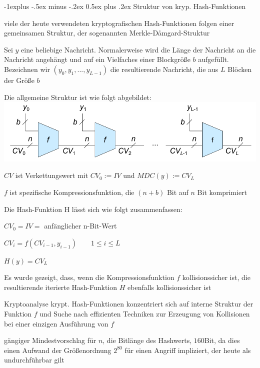 \documentclass[a4paper]{article}
\makeatletter
\renewcommand{\subsection}{\@startsection{subsection}{2}{0mm}%
 {-1explus -.5ex minus -.2ex}%
 {0.5ex plus .2ex}%
 {\normalfont\normalsize\bfseries}}
\makeatother
\begin{document}
\begin{multicols}{3}
      \subsection{Struktur von kryp. Hash-Funktionen}
      \begin{itemize*}
            \item viele der heute verwendeten kryptografischen Hash-Funktionen folgen einer gemeinsamen Struktur, der sogenannten Merkle-Dåmgard-Struktur
            \begin{itemize*}
                  \item Sei $y$ eine beliebige Nachricht. Normalerweise wird die Länge der Nachricht an die Nachricht angehängt und auf ein Vielfaches einer Blockgröße $b$ aufgefüllt. Bezeichnen wir $(y_0,y_1,...,y_{L-1})$ die resultierende Nachricht, die aus $L$ Blöcken der Größe $b$
                  \item Die allgemeine Struktur ist wie folgt abgebildet: \includegraphics[width=.5\linewidth]{Assets/NetworkSecurity-feistel.png}
                  \item $CV$ ist Verkettungswert mit $CV_0:=IV$ und $MDC(y):=CV_L$
                  \item $f$ ist spezifische Kompressionsfunktion, die $(n+b)$ Bit auf $n$ Bit komprimiert
            \end{itemize*}
            \item Die Hash-Funktion H lässt sich wie folgt zusammenfassen:
            \begin{itemize*}
                  \item $CV_0 = IV =$ anfänglicher n-Bit-Wert
                  \item $CV_i = f(CV_{i -1}, y_{i-1}) \quad\quad 1\leq i \leq L$
                  \item $H(y) = CV_L$
            \end{itemize*}
            \item Es wurde gezeigt, dass, wenn die Kompressionsfunktion $f$ kollisionssicher ist, die resultierende iterierte Hash-Funktion $H$ ebenfalls kollisionssicher ist
            \item Kryptoanalyse krypt. Hash-Funktionen konzentriert sich auf interne Struktur der Funktion $f$ und Suche nach effizienten Techniken zur Erzeugung von Kollisionen bei einer einzigen Ausführung von $f$
            \item gängiger Mindestvorschlag für $n$, die Bitlänge des Hashwerts, $160$Bit, da dies einen Aufwand der Größenordnung $2^{80}$ für einen Angriff impliziert, der heute als undurchführbar gilt
      \end{itemize*}


\end{multicols}
\end{document}
